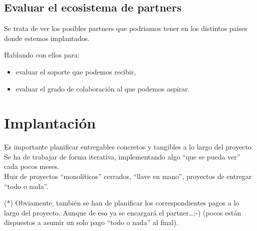\documentclass[spanish,12pt,a4paper,final,oneside]{article}
\begin{document}
\subsection{Evaluar el ecosistema de partners}
Se trata de ver los posibles partners que podriamos tener en los distintos paises donde estemos implantados.

Hablando con ellos para:
\begin{itemize}
\item evaluar el soporte que podemos recibir,
\item evaluar el grado de colaboración al que podemos aspirar.
\end{itemize}


\section{Implantación}

Es importante planificar entregables concretos y tangibles a lo largo del proyecto. Se ha de trabajar de forma iterativa, implementando algo ``que se pueda ver'' cada pocos meses.
\\Huir de proyectos ``monolíticos'' cerrados, ``llave en mano'', proyectos de entregar ``todo o nada''.

(*) Obviamente, también se han de planificar los correspondientes pagos a lo largo del proyecto. Aunque de eso ya se encargará el partner\ldots ;-) (pocos están dispuestos a asumir un solo pago ``todo o nada'' al final).
\end{document}
